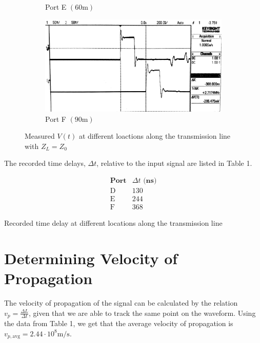 \documentclass[10pt]{article}
\begin{document}
\begin{figure}[ht]
\begin{subfigure}[b]{0.45\textwidth}
        \caption{Port E $(60\text{m})$}
    \end{subfigure}
    \quad
    \begin{subfigure}[b]{0.45\textwidth}
        \includegraphics[width=\textwidth]{../photos/lab1/v_t_pt_f.jpg}
        \caption{Port F $(90\text{m})$}
    \end{subfigure}
    \caption{Measured $V(t)$ at different loactions along the transmission line with $Z_L = Z_0$ \vspace{-0.5cm}}
    \label{v_t_matched_tline}
\end{figure}

The recorded time delays, $\Delta t$, relative to the input signal are listed in Table 1.

\begin{table}[h]
    \[
        \begin{array}{c|c}
            \textbf{Port} & \Delta t \textbf{ (ns)} \\ \hline
            \text{D} & 130\\
            \text{E} & 244\\
            \text{F} & 368
        \end{array}
    \]
    \caption{Recorded time delay at different locations along the transmission line\vspace{-0.5cm}}
\end{table}

\section{Determining Velocity of Propagation}

The velocity of propagation of the signal can be calculated by the relation $v_p = \frac{\Delta L}{\Delta t}$, given that
we are able to track the same point on the waveform. Using the data from Table 1,
we get that the average velocity of propagation is $v_{p, \text{avg}} = 2.44 \cdot 10^8 \text{m/s}$.
\end{document}
